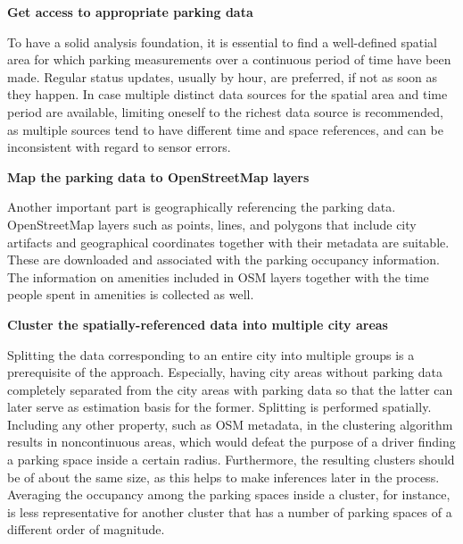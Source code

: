 	\begin{romanlist}
		
		\item{\textbf{Get access to appropriate parking data}}
		
		\noindent To have a solid analysis foundation, it is essential to find a well-defined spatial area for which parking measurements over a continuous period of time have been made. Regular status updates, usually by hour, are preferred, if not as soon as they happen. In case multiple distinct data sources for the spatial area and time period are available, limiting oneself to the richest data source is recommended, as multiple sources tend to have different time and space references, and can be inconsistent with regard to sensor errors.
		
		
		\item{\textbf{Map the parking data to OpenStreetMap layers}}
		
		\noindent Another important part is geographically referencing the parking data. OpenStreetMap layers such as points, lines, and polygons that include city artifacts and geographical coordinates together with their metadata are suitable. These are downloaded and associated with the parking occupancy information. The information on amenities included in OSM layers together with the time people spent in amenities is collected as well.
		
		\item{\textbf{Cluster the spatially-referenced data into multiple city areas}}
		
		\noindent Splitting the data corresponding to an entire city into multiple groups is a prerequisite of the approach. Especially, having city areas without parking data completely separated from the city areas with parking data so that the latter can later serve as estimation basis for the former. Splitting is performed spatially. Including any other property, such as OSM metadata, in the clustering algorithm results in noncontinuous areas, which would defeat the purpose of a driver finding a parking space inside a certain radius. Furthermore, the resulting clusters should be of about the same size, as this helps to make inferences later in the process. Averaging the occupancy among the parking spaces inside a cluster, for instance, is less representative for another cluster that has a number of parking spaces of a different order of magnitude.		
		

\end{romanlist}
